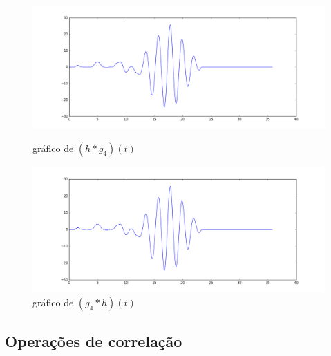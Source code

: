 \documentclass[12pt]{article}
\begin{document}
\begin{figure}[!h]
	\centering
	\begin{minipage}[b]{0.49\linewidth}
		\includegraphics[width=1.15\linewidth]{h*g4.png}
		\caption{gráfico de $(h*g_4)(t)$}
	\end{minipage}
	\hfill
	\begin{minipage}[b]{0.49\linewidth}
		\includegraphics[width=1.15\linewidth]{g4*h.png}
		\caption{gráfico de $(g_4*h)(t)$}
	\end{minipage}
\end{figure}
\clearpage

\subsection{Operações de correlação}
\end{document}

